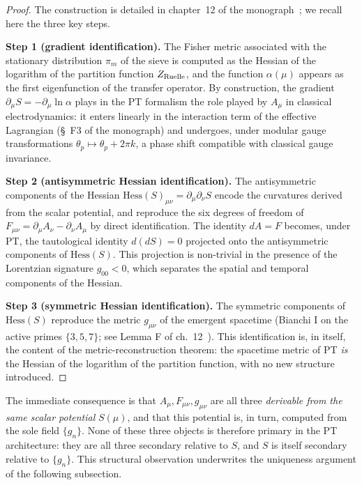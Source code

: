 \begin{proof}[Proof]
The construction is detailed in chapter~12 of the
monograph~\cite{PT_Monograph}; we recall here the three key steps.

\textbf{Step 1 (gradient identification).}
The Fisher metric associated with the stationary distribution
$\pi_m$ of the sieve is computed as the Hessian of the logarithm
of the partition function $Z_{\rm Ruelle}$, and the function
$\alpha(\mu)$ appears as the first eigenfunction of the transfer
operator. By construction, the gradient
$\partial_\mu S = -\partial_\mu \ln \alpha$ plays in the PT formalism
the role played by $A_\mu$ in classical electrodynamics: it enters
linearly in the interaction term of the effective Lagrangian
(\S~F3 of the monograph) and undergoes, under modular gauge
transformations $\theta_p \mapsto \theta_p + 2\pi k$, a phase
shift compatible with classical gauge invariance.

\textbf{Step 2 (antisymmetric Hessian identification).}
The antisymmetric components of the Hessian
$\mathrm{Hess}(S)_{\mu\nu} = \partial_\mu \partial_\nu S$ encode
the curvatures derived from the scalar potential, and reproduce
the six degrees of freedom of $F_{\mu\nu} = \partial_\mu A_\nu -
\partial_\nu A_\mu$ by direct identification. The identity
$dA = F$ becomes, under PT, the tautological identity
$d(dS) = 0$ projected onto the antisymmetric components of
$\mathrm{Hess}(S)$. This projection is non-trivial in the presence
of the Lorentzian signature $g_{00} < 0$, which separates the
spatial and temporal components of the Hessian.

\textbf{Step 3 (symmetric Hessian identification).}
The symmetric components of $\mathrm{Hess}(S)$ reproduce the
metric $g_{\mu\nu}$ of the emergent spacetime (Bianchi I on the
active primes $\{3, 5, 7\}$; see Lemma F of
ch.~12~\cite{PT_Monograph}). This identification is, in itself,
the content of the metric-reconstruction theorem: the
spacetime metric of PT \emph{is} the Hessian of the logarithm of
the partition function, with no new structure introduced.
\end{proof}

The immediate consequence is that $A_\mu, F_{\mu\nu}, g_{\mu\nu}$
are all three \emph{derivable from the same scalar potential}
$S(\mu)$, and that this potential is, in turn, computed from the
sole field $\{g_n\}$. None of these three objects is therefore
primary in the PT architecture: they are all three secondary
relative to $S$, and $S$ is itself secondary relative to
$\{g_n\}$. This structural observation underwrites the uniqueness
argument of the following subsection.

